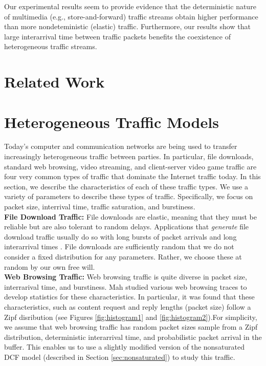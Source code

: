 \documentclass{llncs}
\begin{document}
Our experimental results seem to provide evidence that the deterministic nature of multimedia (e.g., store-and-forward) traffic streams obtain higher performance than more nondeteministic (elastic) traffic. Furthermore, our results show that large interarrival time between traffic packets benefits the coexistence of heterogeneous traffic streams. 

\section{Related Work}


\section{Heterogeneous Traffic Models}
Today's computer and communication networks are being used to transfer increasingly heterogeneous traffic between parties. In particular, file downloads, standard web browsing, video streaming, and client-server video game traffic are four very common types of traffic that dominate the Internet traffic today. In this section, we describe the characteristics of each of these traffic types. We use a variety of parameters to describe these types of traffic. Specifically, we focus on packet size, interrival time, traffic saturation, and burstiness. \\

\noindent
\textbf{File Download Traffic:} File downloads are elastic, meaning that they must be reliable but are also tolerant to random delays. Applications that \emph{generate} file download traffic usually do so with long bursts of packet arrivals and long interarrival times \cite{kumar2004communication}. File downloads are sufficiently random that we do not consider a fixed distribution for any parameters. Rather, we choose these at random by our own free will. \\

\noindent
\textbf{Web Browsing Traffic:} Web browsing traffic is quite diverse in packet size, interrarival time, and burstiness. Mah \cite{mah1997empirical} studied various web browsing traces to develop statistics for these characteristics. In particular, it was found that these characteristics, such as content request and reply lengths (packet size) follow a Zipf disribution (see Figures \ref{fig:histogram1} and \ref{fig:histogram2}).For simplicity, we assume that web browsing traffic has random packet sizes sample from a Zipf distribution, deterministic interarrival time, and probabilistic packet arrival in the buffer. This enables us to use a slightly modified version of the nonsaturated DCF model (described in Section \ref{sec:nonsaturated}) to study this traffic. \\
\end{document}
